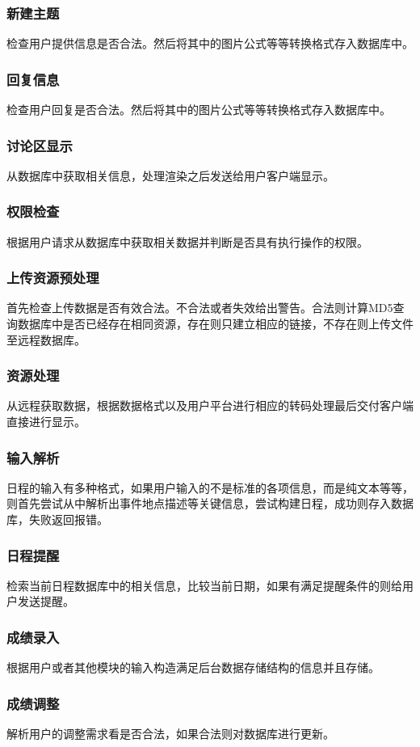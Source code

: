 \subsubsection{新建主题}
检查用户提供信息是否合法。然后将其中的图片公式等等转换格式存入数据库中。
\subsubsection{回复信息}
检查用户回复是否合法。然后将其中的图片公式等等转换格式存入数据库中。
\subsubsection{讨论区显示}
从数据库中获取相关信息，处理渲染之后发送给用户客户端显示。
\subsubsection{权限检查}
根据用户请求从数据库中获取相关数据并判断是否具有执行操作的权限。
\subsubsection{上传资源预处理}
首先检查上传数据是否有效合法。不合法或者失效给出警告。合法则计算MD5查询数据库中是否已经存在相同资源，存在则只建立相应的链接，不存在则上传文件至远程数据库。
\subsubsection{资源处理}
从远程获取数据，根据数据格式以及用户平台进行相应的转码处理最后交付客户端直接进行显示。
\subsubsection{输入解析}
日程的输入有多种格式，如果用户输入的不是标准的各项信息，而是纯文本等等，则首先尝试从中解析出事件地点描述等关键信息，尝试构建日程，成功则存入数据库，失败返回报错。
\subsubsection{日程提醒}
检索当前日程数据库中的相关信息，比较当前日期，如果有满足提醒条件的则给用户发送提醒。
\subsubsection{成绩录入}
根据用户或者其他模块的输入构造满足后台数据存储结构的信息并且存储。
\subsubsection{成绩调整}
解析用户的调整需求看是否合法，如果合法则对数据库进行更新。

